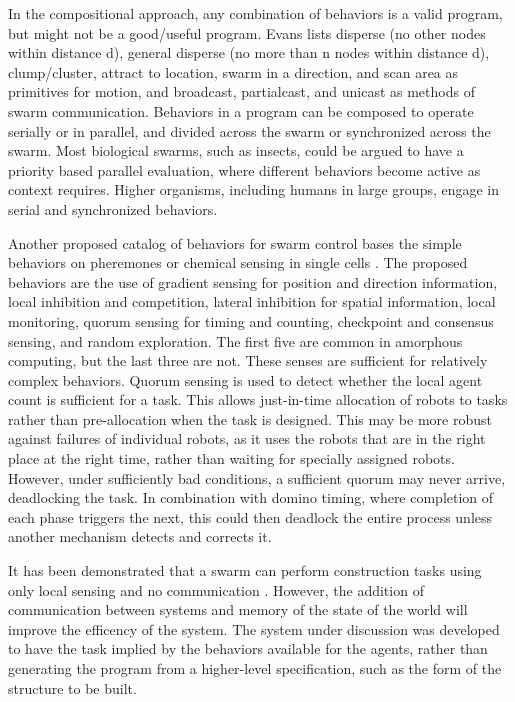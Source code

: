 \documentclass[]{article}
\begin{document}
In the compositional approach, any combination of behaviors is a valid program, but might not be a good/useful program. 
Evans lists disperse (no other nodes within distance d), general disperse (no more than n nodes within distance d), clump/cluster, attract to location, swarm in a direction, and scan area as primitives for motion, and broadcast, partialcast, and unicast as methods of swarm communication.
Behaviors in a program can be composed to operate serially or in parallel, and divided across the swarm or synchronized across the swarm. 
Most biological swarms, such as insects, could be argued to have a priority based parallel evaluation, where different behaviors become active as context requires.
Higher organisms, including humans in large groups, engage in serial and synchronized behaviors. %

Another proposed catalog of behaviors for swarm control bases the simple behaviors on pheremones or chemical sensing in single cells \cite{nagpal2004catalog}. 
The proposed behaviors are the use of gradient sensing for position and direction information, local inhibition and competition, lateral inhibition for spatial information, local monitoring, quorum sensing for timing and counting, checkpoint and consensus sensing, and random exploration. 
The first five are common in amorphous computing, but the last three are not. %
These senses are sufficient for relatively complex behaviors. 
Quorum sensing is used to detect whether the local agent count is sufficient for a task. 
This allows just-in-time allocation of robots to tasks rather than pre-allocation when the task is designed. 
This may be more robust against failures of individual robots, as it uses the robots that are in the right place at the right time, rather than waiting for specially assigned robots. 
However, under sufficiently bad conditions, a sufficient quorum may never arrive, deadlocking the task. 
In combination with domino timing, where completion of each phase triggers the next, this could then deadlock the entire process unless another mechanism detects and corrects it.

It has been demonstrated that a swarm can perform construction tasks using only local sensing and no communication \cite{wawerla2002collective}.
However, the addition of communication between systems and memory of the state of the world will improve the efficency of the system.
The system under discussion was developed to have the task implied by the behaviors available for the agents, rather than generating the program from a higher-level specification, such as the form of the structure to be built.
\end{document}
